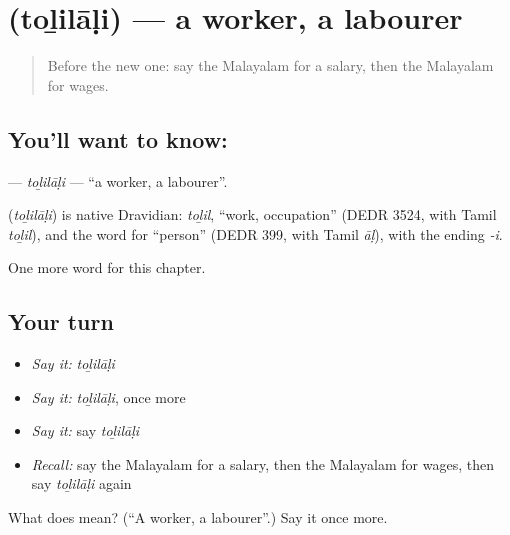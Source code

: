 \section[\texorpdfstring{\ml{തൊഴിലാളി} (toḻilāḷi)}{തൊഴിലാളി (toḻilāḷi)}]{ (toḻilāḷi) — a worker, a labourer}

\label{lesson:ML-C298-tolilali}



\begin{quote}
Before the new one: say the Malayalam for a salary, then the Malayalam for wages.
\end{quote}

\subsection*{You'll want to know: }
\textbf{} — \emph{toḻilāḷi} — \textquotedblleft{}a worker, a labourer\textquotedblright{}.

\begin{cousinweb}
\textbf{} (\emph{toḻilāḷi}) is native Dravidian: \emph{toḻil}, \textquotedblleft{}work, occupation\textquotedblright{} (DEDR 3524, with Tamil \emph{toḻil}), and the word for \textquotedblleft{}person\textquotedblright{} (DEDR 399, with Tamil \emph{āḷ}), with the ending \emph{-i}.
\end{cousinweb}

\begin{grammarlens}[title={What you've built}]
One more word for this chapter.
\end{grammarlens}

\subsection*{Your turn}
\begin{itemize}
\raggedright
  \item \emph{Say it:} \emph{toḻilāḷi}
  \item \emph{Say it:} \emph{toḻilāḷi}, once more
  \item \emph{Say it:} say \emph{toḻilāḷi}
  \item \emph{Recall:} say the Malayalam for a salary, then the Malayalam for wages, then say \emph{toḻilāḷi} again
\end{itemize}

\begin{tcolorbox}[breakable,colback=teal!4,colframe=teal!35!black,title={Before you move on}]
What does  mean? (\textquotedblleft{}A worker, a labourer\textquotedblright{}.) Say it once more.
\end{tcolorbox}
